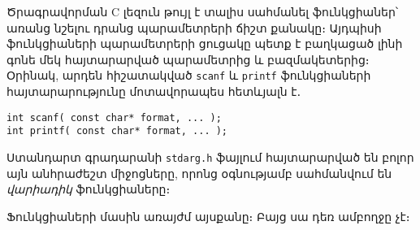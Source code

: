 Ծրագրավորման C լեզուն թույլ է տալիս սահմանել ֆունկցիաներ՝ առանց նշելու
դրանց պարամետրերի ճիշտ քանակը։ Այդպիսի ֆունկցիաների պարամետրերի ցուցակը
պետք է բաղկացած լինի գոնե մեկ հայտարարված պարամետրից և բազմակետերից։
Օրինակ, արդեն հիշատակված \texttt{scanf} և \texttt{printf} ֆունկցիաների
հայտարարությունը մոտավորապես հետևյալն է․

\begin{verbatim}
int scanf( const char* format, ... );
int printf( const char* format, ... );
\end{verbatim}

Ստանդարտ գրադարանի \texttt{stdarg.h} ֆայլում հայտարարված են բոլոր այն
անհրաժեշտ միջոցները, որոնց օգնությամբ սահմանվում են \emph{վարիադիկ}
ֆունկցիաները։

Ֆունկցիաների մասին առայժմ այսքանը։ Բայց սա դեռ ամբողջը չէ։

